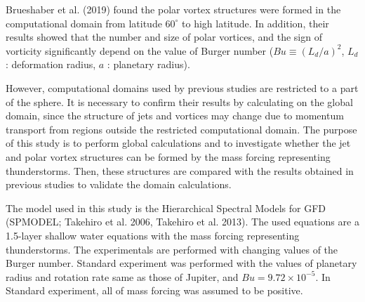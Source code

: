 \documentclass[a4j,8pt]{jarticle}
\begin{document}
%
Brueshaber et al. (2019) found the polar vortex structures were formed
in the computational domain from latitude $60^\circ$ to high latitude.
%
In addition, their results showed
that the number and size of polar vortices,
and the sign of vorticity significantly depend on
the value of Burger number ($Bu \equiv (L_d/a)^2$, $L_d$ : deformation radius, $a$ : planetary radius).

However, computational domains used by previous studies are restricted to a part of the sphere.
It is necessary to confirm their results by calculating on the global domain, 
since the structure of jets and vortices may change due to momentum transport from
regions outside the restricted computational domain.
%
The purpose of this study is to perform global calculations and to investigate
whether the jet and polar vortex structures 
can be formed by the mass forcing representing thunderstorms.
%
Then, these structures are compared with the results obtained in previous studies
to validate the domain calculations.

The model used in this study is the Hierarchical Spectral Models for GFD (SPMODEL; Takehiro et al. 2006, Takehiro et al. 2013).
%
The used equations are a 1.5-layer shallow water equations
with the mass forcing representing thunderstorms.
The experimentals are performed with changing values of 
the Burger number.
Standard experiment was performed with the values of 
planetary radius and rotation rate same as those of Jupiter,
and $Bu = 9.72 \times 10^{-5}$.
In Standard experiment, all of mass forcing was assumed to be positive.
\end{document}
